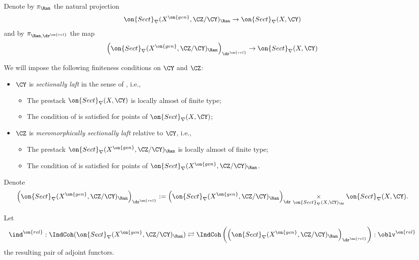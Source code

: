 \documentclass[9pt]{amsart}
\theoremstyle{remark}
\theoremstyle{definition}
\theoremstyle{remark}
\numberwithin{equation}{section}
\begin{document}
\medskip

Denote by $\pi_\Ran$ the natural projection 
$$\on{Sect}_\nabla(X^{\on{gen}},\CZ/\CY)_\Ran \to \on{Sect}_\nabla(X,\CY)$$
and by $\pi_{\Ran,\dr^{\on{rel}}}$ the map
$$\left(\on{Sect}_\nabla(X^{\on{gen}},\CZ/\CY)_\Ran\right)_{\dr^{\on{rel}}} \to \on{Sect}_\nabla(X,\CY)$$


\sssec{} \label{sss:fin cond D stacks}

We will impose the following finiteness conditions on $\CY$ and $\CZ$:

\begin{itemize}

\item $\CY$ is \emph{sectionally laft} in the sense of \cite[Sect. 3.1.3(ii)]{Ro}, i.e.,

\begin{itemize}

\item The prestack $\on{Sect}_\nabla(X,\CY)$ is locally almost of finite type;

\item The condition of \cite[Sect. 3.1.3(ii)]{Ro} is satisfied for points of  $\on{Sect}_\nabla(X,\CY)$;

\end{itemize}

\item $\CZ$ is \emph{meromorphically sectionally laft} relative to $\CY$, i.e., 

\begin{itemize}

\item The prestack $\on{Sect}_\nabla(X^{\on{gen}},\CZ/\CY)_\Ran$ is locally almost of finite type;

\item The condition of \cite[Sect. 3.1.3(ii)]{Ro} is satisfied for points of $\on{Sect}_\nabla(X^{\on{gen}},\CZ/\CY)_\Ran$. 

\end{itemize}

\end{itemize} 

\sssec{}

Denote
$$\left(\on{Sect}_\nabla(X^{\on{gen}},\CZ/\CY)_\Ran\right)_{\dr^{\on{rel}}}:=
\left(\on{Sect}_\nabla(X^{\on{gen}},\CZ/\CY)_\Ran\right)_\dr\underset{\on{Sect}_\nabla(X,\CY)_\dr}\times \on{Sect}_\nabla(X,\CY).$$

\medskip

Let
\begin{equation} \label{e:ind oblv pair}
\ind^{\on{rel}}:\IndCoh(\on{Sect}_\nabla(X^{\on{gen}},\CZ/\CY)_\Ran)\rightleftarrows 
\IndCoh\left(\left(\on{Sect}_\nabla(X^{\on{gen}},\CZ/\CY)_\Ran\right)_{\dr^{\on{rel}}}\right):\oblv^{\on{rel}}
\end{equation}
the resulting pair of adjoint functors. 
\end{document}
